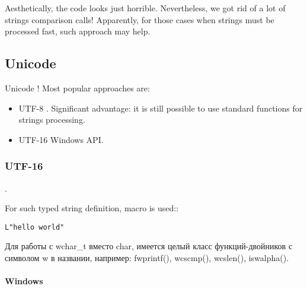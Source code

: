 {Aesthetically, the code looks just horrible}.
{Nevertheless, we got rid of a lot of strings comparison calls}! 
{Apparently, for those cases when strings must be processed fast, such approach may help}.




\subsection{Unicode}

Unicode ! 
{Most popular approaches are}:

\begin{itemize}
\item UTF-8
.
{Significant advantage: it is still possible to use standard functions for strings processing}.

\item UTF-16
 Windows API.
\end{itemize}

\subsubsection{UTF-16}

.

{For such typed string definition,  macro is used:}:

\begin{lstlisting}
L"hello world"
\end{lstlisting}

Для работы с wchar\_t вместо char, имеется целый класс функций-двойников с символом w в названии,
например: fwprintf(), wcscmp(), wcslen(), iswalpha().

\paragraph{Windows}

